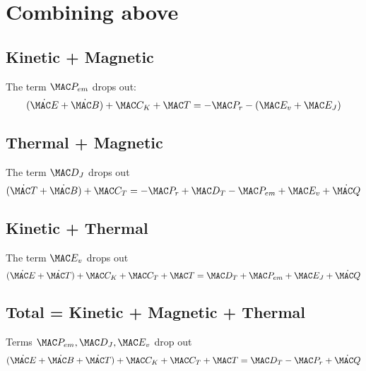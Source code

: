 \documentclass[11pt]{article}
\begin{document}
\section{Combining above}
\subsection{Kinetic + Magnetic}
The term $\MAC P_{em}$ drops out:
\begin{equation}
	(\dot{\MAC E} + \dot{\MAC B}) + \MAC C_K + \MAC T = -\MAC P_r - (\MAC E_v + \MAC E_J)
\end{equation}

\subsection{Thermal + Magnetic}
The term $\MAC D_J$ drops out
\begin{equation}
	(\dot{\MAC T}+\dot{\MAC B}) + \MAC C_T = -\MAC P_r + \MAC D_T - \MAC P_{em} + \MAC E_v + \dot{\MAC Q}
\end{equation}

\subsection{Kinetic + Thermal}
The term $\MAC E_v$ drops out
\begin{equation}
	(\dot{\MAC E}+\dot{\MAC T}) + \MAC C_K + \MAC C_T + \MAC T = \MAC D_T + \MAC P_{em} + \MAC E_J + \dot{\MAC Q}
\end{equation}

\subsection{Total = Kinetic + Magnetic + Thermal}
Terms $\MAC P_{em}, \MAC D_J, \MAC E_v$ drop out
\begin{equation}
	(\dot{\MAC E}+\dot{\MAC B}+\dot{\MAC T}) + \MAC C_K + \MAC C_T + \MAC T = \MAC D_T - \MAC P_r + \dot{\MAC Q}
\end{equation}
\end{document}
